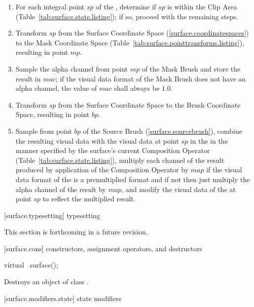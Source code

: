 \begin{enumerate}
\item For each integral point $sp$ of the \underlyingsurface, determine if $sp$ is within the Clip Area (Table~\ref{tab:surface.state.listing}); if so, proceed with the remaining steps.
\item Transform $sp$ from the Surface Coordinate Space (\ref{surface.coordinatespaces}) to the Mask Coordinate Space (Table~\ref{tab:surface.pointtransforms.listing}), resulting in point $mp$.
\item Sample the alpha channel from point $mp$ of the Mask Brush and store the result in $mac$; if the visual data format of the Mask Brush does not have an alpha channel, the value of $mac$ shall always be $1.0$.
\item Transform $sp$ from the Surface Coordinate Space to the Brush Coordinate Space, resulting in point $bp$.
\item Sample from point $bp$ of the Source Brush (\ref{surface.sourcebrush}), combine the resulting visual data with the visual data at point $sp$ in the \underlyingsurface in the manner specified by the surface's current Composition Operator (Table~\ref{tab:surface.state.listing}), multiply each channel of the result produced by application of the Composition Operator by $map$ if the visual data format of the \underlyingsurface is a premultiplied format and if not then just multiply the alpha channel of the result by $map$, and modify the visual data of the \underlyingsurface at point $sp$ to reflect the multiplied result.
\end{enumerate}

 [surface.typesetting] { typesetting}

\pnum
This section is forthcoming in a future revision.

 [surface.cons] { constructors, assignment operators, and destructors}

\begin{itemdecl}
virtual ~surface();
\end{itemdecl}
\begin{itemdescr}
\pnum
\effects
Destroys an object of class .
\end{itemdescr}

 [surface.modifiers.state] { state modifiers}

